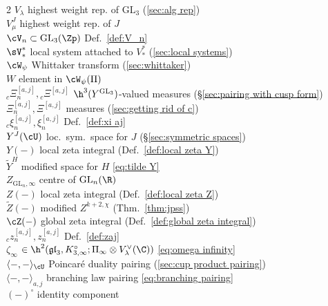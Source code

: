 \documentclass[10pt,reqno,a4paper]{amsart}
\newcommand{\GL}{\mathrm{GL}}
\begin{document}
\begin{multicols}{2}
	$V_\lambda$ \dotfill highest weight rep. of $\GL_3$ (\cref{sec:alg rep})\\
	$V_\mu^J$ \dotfill highest weight rep. of $J$\\
	$\cV_n \subset \GL_3(\Zp)$ \dotfill Def.\ \ref{def:V_n}\\
	$\sV_*^\ast$ \dotfill local system attached to $V_*^\ast$ (\cref{sec:local systems}) \\
	$\cW_\psi$ \dotfill Whittaker transform (\cref{sec:whittaker})\\
	$W$ \dotfill element in $\cW_\psi(\Pi)$\\
	${}_c\Xi^{[a,j]}_n, {}_c\Xi^{[a,j]}$ \dotfill $\h^3(Y^{\GL_3})$-valued measures (\S\ref{sec:pairing with cusp form})\\
	$\Xi^{[a,j]}_n, \Xi^{[a,j]}$ \dotfill measures (\cref{sec:getting rid of c})\\
	${}_c \xi^{[a,j]}_n, \xi^{[a,j]}_n$ \dotfill Def.\ \ref{def:xi aj}\\
	$Y^J(\cU)$ \dotfill loc.\ sym.\ space for $J$ (\S \ref{sec:symmetric spaces})\\
	$Y(-)$ \dotfill local zeta integral (Def.\ \ref{def:local zeta Y})\\
	$\widetilde{Y}^H$ \dotfill modified space for $H$ \eqref{eq:tilde Y}\\
	$Z_{\GL_n,\infty}$ \dotfill centre of $\GL_n(\R)$\\
	$Z(-)$ \dotfill local zeta integral (Def.\ \ref{def:local zeta Z})\\
	$\widetilde{Z}(-)$ \dotfill modified $Z^{k+2,\chi}$ (Thm.\ \ref{thm:jpss})\\
	$\cZ(-)$ \dotfill global zeta integral (Def.\ \ref{def:global zeta integral})\\
	${}_c z^{[a,j]}_n, z^{[a,j]}_n$ \dotfill Def.\ \ref{def:zaj}\\
	$\zeta_\infty$ \dotfill  $\in \h^2(\mathfrak{gl}_3,K_{3,\infty}^\circ; \Pi_\infty \otimes V_{\lambda}^{\vee}(\C) )$ \eqref{eq:omega infinity}\\
	$\langle-,-\rangle_{\cU}$ \dotfill Poincar\'e duality pairing (\cref{sec:cup product pairing})\\
	$\langle-,-\rangle_{a,j}$ \dotfill branching law pairing \eqref{eq:branching pairing}\\
	$(-)^\circ$ \dotfill identity component
\end{multicols}


%
%
\footnotesize
\setlength{\parskip}{0ex}
\renewcommand{\baselinestretch}{1}
\renewcommand{\refname}{\normalsize References}
\end{document}
